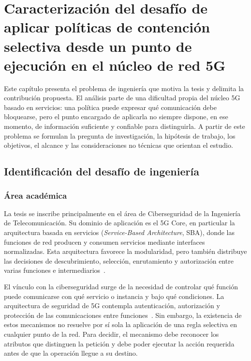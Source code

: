 \chapter{Caracterización del desafío de aplicar políticas de contención selectiva desde un punto de ejecución en el núcleo de red 5G}
\label{chap:planteamiento}

Este capítulo presenta el problema de ingeniería que motiva la tesis y delimita la contribución propuesta. El análisis parte de una dificultad propia del núcleo 5G basado en servicios: una política puede expresar qué comunicación debe bloquearse, pero el punto encargado de aplicarla no siempre dispone, en ese momento, de información suficiente y confiable para distinguirla. A partir de este problema se formulan la pregunta de investigación, la hipótesis de trabajo, los objetivos, el alcance y las consideraciones no técnicas que orientan el estudio.

\newpage

\section{Identificación del desafío de ingeniería}
\label{sec:desafio-ingenieria}

\subsection{Área académica}

La tesis se inscribe principalmente en el área de Ciberseguridad de la Ingeniería de Telecomunicación. Su dominio de aplicación es el 5G Core, en particular la arquitectura basada en servicios (\textit{Service-Based Architecture}, SBA), donde las funciones de red producen y consumen servicios mediante interfaces normalizadas. Esta arquitectura favorece la modularidad, pero también distribuye las decisiones de descubrimiento, selección, enrutamiento y autorización entre varias funciones e intermediarios~\cite{ETSI_TS_123501_R16,ETSI_TS_129500_R16}.

El vínculo con la ciberseguridad surge de la necesidad de controlar qué función puede comunicarse con qué servicio o instancia y bajo qué condiciones. La arquitectura de seguridad de 5G contempla autenticación, autorización y protección de las comunicaciones entre funciones~\cite{ETSI_TS_133501_R16}. Sin embargo, la existencia de estos mecanismos no resuelve por sí sola la aplicación de una regla selectiva en cualquier punto de la red. Para decidir, el mecanismo debe reconocer los atributos que distinguen la petición y debe poder ejecutar la acción requerida antes de que la operación llegue a su destino.

